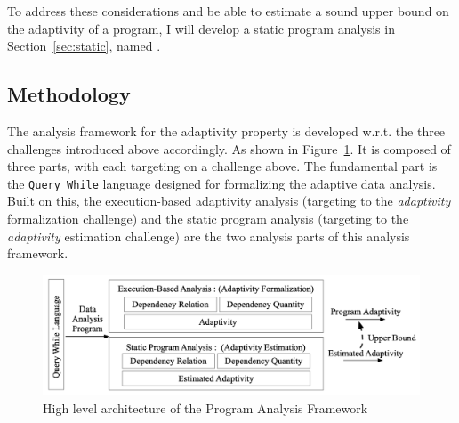 \begin{enumerate}
To address these considerations and be able to estimate a sound upper bound on the adaptivity of a program, 
I will develop a static program analysis in Section~\ref{sec:static}, named {\THESYSTEM}.
\end{enumerate}%


\subsection{Methodology}
\label{subsec:intro-adapt}
The analysis framework for the adaptivity property is 
developed w.r.t. the three challenges introduced above accordingly.
As shown in Figure~\ref{fig:structure}.
It is composed of three parts, with each targeting on a challenge above.
The fundamental part is the {\tt Query While} language designed for formalizing the 
adaptive data analysis. Built on this, 
the execution-based adaptivity analysis (targeting to the \emph{adaptivity} formalization challenge)
and the static program analysis (targeting to the \emph{adaptivity} estimation challenge) 
are the two analysis parts of this 
analysis framework.
\begin{figure}
   \centering   
   \includegraphics[width=1.0\textwidth]{figures/overview.png}
  \caption{High level architecture of the Program Analysis Framework}
   \label{fig:structure}
\end{figure}

